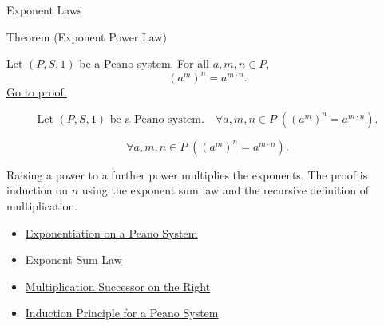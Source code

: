 \begin{topicbox}{Exponent Laws}
\begin{theorembox}{Theorem (Exponent Power Law)}
\begin{theorem}
\label{thm:exponent-power-law}
Let $(P,S,1)$ be a Peano system. For all $a,m,n \in P$,
\[
(a^m)^n = a^{m \cdot n}.
\]
\hyperref[prf:exponent-power-law]{Go to proof.}
\end{theorem}
\end{theorembox}

\begin{remark*}
\[
\text{Let } (P,S,1) \text{ be a Peano system.}\quad
\forall a,m,n \in P\;((a^m)^n = a^{m \cdot n}).
\]
\end{remark*}

\begin{remark*}
\[
\forall a,m,n \in P\;((a^m)^n = a^{m \cdot n}).
\]
\end{remark*}

\begin{remark*}[Interpretation]
Raising a power to a further power multiplies the exponents. The proof is
induction on $n$ using the exponent sum law and the recursive definition of
multiplication.
\end{remark*}

\begin{dependencies}
\begin{itemize}
  \item \hyperref[def:exponentiation-on-peano-system]{Exponentiation on a Peano System}
  \item \hyperref[thm:exponent-sum-law]{Exponent Sum Law}
  \item \hyperref[thm:multiplication-successor-on-right]{Multiplication Successor on the Right}
  \item \hyperref[thm:induction-principle-for-peano-system]{Induction Principle for a Peano System}
\end{itemize}
\end{dependencies}
\end{topicbox}

